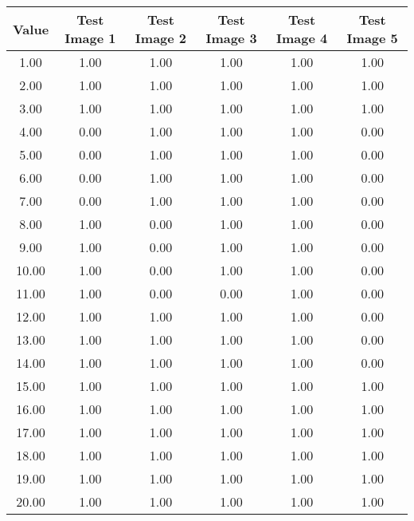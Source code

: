 \begin{tabular}{|c|c|c|c|c|c|}
\hline
\textbf{Value}&\textbf{Test Image 1}&\textbf{Test Image 2}&\textbf{Test Image 3}&\textbf{Test Image 4}&\textbf{Test Image 5}\\\hline
1.00&1.00&1.00&1.00&1.00&1.00\\\hline
2.00&1.00&1.00&1.00&1.00&1.00\\\hline
3.00&1.00&1.00&1.00&1.00&1.00\\\hline
4.00&0.00&1.00&1.00&1.00&0.00\\\hline
5.00&0.00&1.00&1.00&1.00&0.00\\\hline
6.00&0.00&1.00&1.00&1.00&0.00\\\hline
7.00&0.00&1.00&1.00&1.00&0.00\\\hline
8.00&1.00&0.00&1.00&1.00&0.00\\\hline
9.00&1.00&0.00&1.00&1.00&0.00\\\hline
10.00&1.00&0.00&1.00&1.00&0.00\\\hline
11.00&1.00&0.00&0.00&1.00&0.00\\\hline
12.00&1.00&1.00&1.00&1.00&0.00\\\hline
13.00&1.00&1.00&1.00&1.00&0.00\\\hline
14.00&1.00&1.00&1.00&1.00&0.00\\\hline
15.00&1.00&1.00&1.00&1.00&1.00\\\hline
16.00&1.00&1.00&1.00&1.00&1.00\\\hline
17.00&1.00&1.00&1.00&1.00&1.00\\\hline
18.00&1.00&1.00&1.00&1.00&1.00\\\hline
19.00&1.00&1.00&1.00&1.00&1.00\\\hline
20.00&1.00&1.00&1.00&1.00&1.00\\\hline
\end{tabular}
